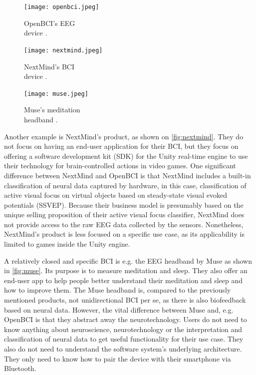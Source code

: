 \begin{figure}[!ht]
  \texttt{[image: openbci.jpeg]}
  \caption[OpenBCI's EEG device]{OpenBCI's EEG \\ device \citep{be_superhvman_conor_2017}.}
  \label{fig:openbci}
  \endminipage\hfill
  \texttt{[image: nextmind.jpeg]}
  \caption[NextMind's BCI device]{NextMind's BCI \\ device \citep{louise_neurotechnology_2019}.}
  \label{fig:nextmind}
  \endminipage\hfill
  \texttt{[image: muse.jpeg]}
  \caption[Muse's meditation headband]{Muse's meditation \\ headband \citep{muse_muse_nodate}.}
  \label{fig:muse}
  \endminipage
\end{figure}

Another example is NextMind's product, as shown on \autoref{fig:nextmind}. They do not focus on having an end-user application for their BCI, but they focus on offering a software development kit (SDK) for the Unity real-time engine to use their technology for brain-controlled actions in video games. One significant difference between NextMind and OpenBCI is that NextMind includes a built-in classification of neural data captured by hardware, in this case, classification of active visual focus on virtual objects based on steady-state visual evoked potentials (SSVEP). Because their business model is presumably based on the unique selling proposition of their active visual focus classifier, NextMind does not provide access to the raw EEG data collected by the sensors. Nonetheless, NextMind's product is less focused on a specific use case, as its applicability is limited to games inside the Unity engine.

A relatively closed and specific BCI is e.g. the EEG headband by Muse as shown in \autoref{fig:muse}. Its purpose is to measure meditation and sleep. They also offer an end-user app to help people better understand their meditation and sleep and how to improve them. The Muse headband is, compared to the previously mentioned products, not unidirectional BCI per se, as there is also biofeedback based on neural data. However, the vital difference between Muse and, e.g. OpenBCI is that they abstract away the neurotechnology. Users do not need to know anything about neuroscience, neurotechnology or the interpretation and classification of neural data to get useful functionality for their use case. They also do not need to understand the software system's underlying architecture. They only need to know how to pair the device with their smartphone via Bluetooth.

